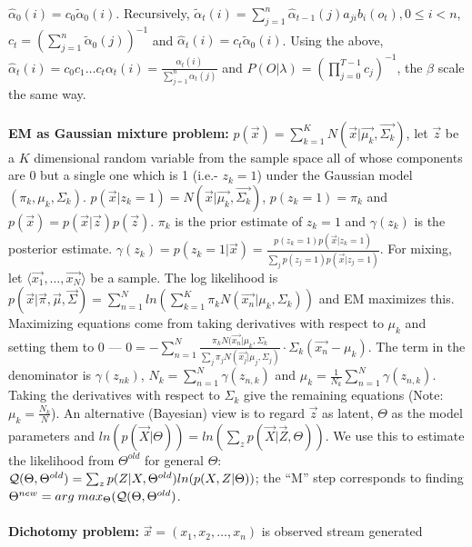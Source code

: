 $\hat{\alpha}_0(i)= c_0 \tilde{\alpha}_0(i)$.  Recursively,
$\tilde{\alpha}_t(i)= \sum_{j=1}^{n} \hat{\alpha}_{t-1}(j) a_{ji}b_i(o_t),
0 \le i <n$,
$c_t= (\sum_{j=1}^{n} \tilde{\alpha}_0(j))^{-1}$ and
$\hat{\alpha}_t(i)= c_t \tilde{\alpha}_0(i)$.
Using the above, $\hat{\alpha}_t(i) = c_0 c_1 \ldots c_t \alpha_t(i)= {\frac {\alpha_t(i)}
{\sum_{j=1}^{n} \alpha_t(j)}}$ and $P(O|\lambda)= (\prod_{j=0}^{T-1} c_j)^{-1}$,
the $\beta$ scale the same way.
\\
\\
{\bf EM as Gaussian mixture problem:}
$p({\vec x})= \sum_{k=1}^K N({\vec x} | {\vec {\mu_k}}, {\vec {\Sigma_k}})$,
let ${\vec z}$ be a $K$ dimensional random variable from the
sample space all of whose components are $0$ but a single one which is 1 (i.e.- $z_k=1$) under
the Gaussian model $(\pi_k, \mu_k, \Sigma_k)$.
$p({\vec x}| z_k=1)= N({\vec x} | {\vec {\mu_k}}, {\vec {\Sigma_k}})$, $p(z_k=1)= \pi_k$ and
$p({\vec x})=
p({\vec x} | {\vec z}) p({\vec z})$.  $\pi_k$ is the prior estimate of
$z_k=1$ and $\gamma(z_k)$ is the posterior estimate.
$\gamma(z_k)= p(z_k=1| {\vec x})= {\frac {p(z_k=1) p({\vec x} | z_k=1)}
{\sum_j p(z_j=1) p({\vec x}| z_j=1)}}$.  For mixing, let 
$\langle {\vec {x_1}}, \ldots , {\vec {x_N}} \rangle$ be a sample.
The log likelihood is
$p({\vec x} | {\vec {\pi}}, {\vec {\mu}}, {\vec {\Sigma}}) =
\sum_{n=1}^N ln( \sum_{k=1}^K \pi_k N({\vec {x_n}}| \mu_k, \Sigma_k))$ and EM
maximizes this.  Maximizing equations come from taking derivatives with
respect to $\mu_k$ and setting them to $0$ --- 
$0= - \sum_{n=1}^N  {\frac {\pi_k N({\vec {x_n}}| \mu_k, \Sigma_k}
{\sum_j \pi_j N({\vec {x_j}}| \mu_j, \Sigma_j)}} \cdot 
\Sigma_k ({\vec {x_n}}- \mu_k)$.  The term in the denominator is 
$\gamma(z_{nk})$, $N_k= \sum_{n=1}^N \gamma(z_{n,k})$ and 
$\mu_k = {\frac 1 {N_k}} \sum_{n=1}^N \gamma(z_{n,k})$.  Taking the derivatives with respect
to $\Sigma_k$ give the remaining equations (Note: $\mu_k= {\frac {N_k} {N}}$).
An alternative (Bayesian) 
view is to regard ${\vec z}$ as latent, $\Theta$ as the model parameters
and $ln(p({\vec X} | \Theta))= ln(\sum_z p({\vec X} | {\vec Z}, \Theta))$.  We use
this to estimate the likelihood from $\Theta^{old}$ for general $\Theta$:
${\cal Q}(\Theta, \Theta^{old})= \sum_z p(Z| X, \Theta^{old}) ln(p(X,Z| \Theta))$; the
``M'' step corresponds to finding 
$\Theta^{new}= arg \; max_{\Theta} ({\cal Q} (\Theta, \Theta^{old})$.
\\
\\
{\bf Dichotomy problem:} ${\vec x}= (x_1 , x_2 , \ldots, x_n)$ is observed stream generated
